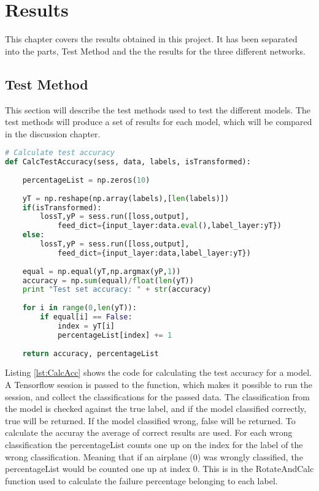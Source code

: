 \chapter{Results}
\label{chp:results}

This chapter covers the results obtained in this project. It has been separated into the parts, Test Method and the the results for the three different networks.

\section{Test Method}

This section will describe the test methods used to test the different models. The test methods will produce a set of results for each model, which will be compared in the discussion chapter.

\begin{lstlisting}[language=Python, label=lst:CalcAcc, caption=Function to calculate the test accuracy for a model]
# Calculate test accuracy
def CalcTestAccuracy(sess, data, labels, isTransformed):
    
    percentageList = np.zeros(10)
    
    yT = np.reshape(np.array(labels),[len(labels)])
    if(isTransformed):
        lossT,yP = sess.run([loss,output],
        	feed_dict={input_layer:data.eval(),label_layer:yT})
    else:
        lossT,yP = sess.run([loss,output],
        	feed_dict={input_layer:data,label_layer:yT})
    
    equal = np.equal(yT,np.argmax(yP,1))
    accuracy = np.sum(equal)/float(len(yT))
    print "Test set accuracy: " + str(accuracy)
    
    for i in range(0,len(yT)):
        if equal[i] == False:
            index = yT[i]
            percentageList[index] += 1
    
    return accuracy, percentageList
\end{lstlisting}

Listing \ref{lst:CalcAcc} shows the code for calculating the test accuracy for a model. A Tensorflow session is passed to the function, which makes it possible to run the session, and collect the classifications for the passed data. The classification from the model is checked against the true label, and if the model classified correctly, true will be returned. If the model classified wrong, false will be returned. To calculate the accuray the average of correct results are used. For each wrong classification the percentageList counts one up on the index for the label of the wrong classification. Meaning that if an airplane (0) was wrongly classified, the percentageList would be counted one up at index 0. This is in the RotateAndCalc function used to calculate the failure percentage belonging to each label.

